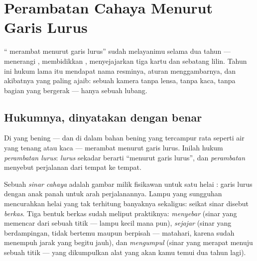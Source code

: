 \chapter{Perambatan Cahaya Menurut Garis Lurus}\label{ch:g6:light-propagation}

`` merambat menurut garis lurus'' sudah melayanimu selama dua
tahun --- menerangi , membidikkan , menyejajarkan
tiga kartu dan sebatang lilin. Tahun ini hukum lama itu mendapat nama
resminya, aturan menggambarnya, dan akibatnya yang paling ajaib:
sebuah kamera tanpa lensa, tanpa kaca, tanpa bagian yang bergerak ---
hanya sebuah lubang.

\section{Hukumnya, dinyatakan dengan benar}

\begin{proposition}\label{prop:g6:light-propagation:law}
Di  yang bening --- dan di dalam bahan bening yang tercampur rata
seperti air yang tenang atau kaca ---  merambat menurut garis
lurus. Inilah hukum \emph{perambatan lurus}:
\emph{lurus} sekadar berarti ``menurut garis lurus'', dan
\emph{perambatan} menyebut perjalanan  dari tempat ke tempat.
\end{proposition}

\begin{definition}\label{def:g6:light-propagation:ray}
Sebuah \emph{sinar cahaya} adalah gambar milik
fisikawan untuk satu helai : garis lurus dengan anak panah untuk
arah perjalanannya. Lampu yang sungguhan mencurahkan helai yang tak
terhitung banyaknya sekaligus: seikat sinar disebut
\emph{berkas}. Tiga bentuk berkas sudah meliput
praktiknya: \emph{menyebar} (sinar yang memencar dari sebuah titik ---
lampu kecil mana pun), \emph{sejajar} (sinar yang berdampingan, tidak
bertemu maupun berpisah ---  matahari, karena sudah menempuh
jarak yang begitu jauh), dan \emph{mengumpul} (sinar yang merapat
menuju sebuah titik ---  yang dikumpulkan alat yang akan kamu
temui dua tahun lagi).
\end{definition}


